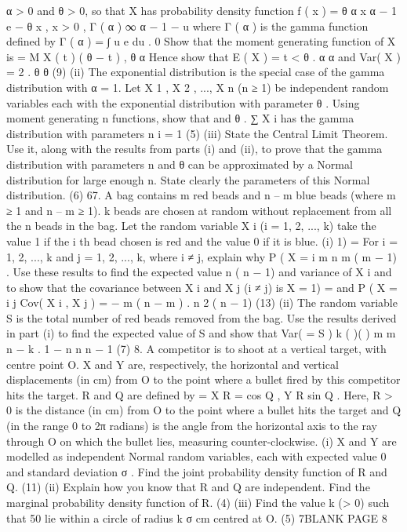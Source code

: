 α > 0 and θ > 0, so that X has probability density function
f ( x )
=
θ α x α − 1 e − θ x
, x > 0 ,
Γ ( α )
∞
α − 1 − u
where Γ ( α ) is the gamma function defined by Γ ( α ) =
∫ u e du .
0
Show that the moment generating function of X is
=
M X ( t )
( θ − t ) ,
θ
α
Hence show that E ( X ) =
t < θ .
α
α
and Var( X ) = 2 .
θ
θ
(9)
(ii)
The exponential distribution is the special case of the gamma distribution with
α = 1. Let X 1 , X 2 , ..., X n (n ≥ 1) be independent random variables each with
the exponential distribution with parameter θ . Using moment generating
n
functions, show that
and θ .
∑ X i
has the gamma distribution with parameters n
i = 1
(5)
(iii)
State the Central Limit Theorem. Use it, along with the results from parts (i)
and (ii), to prove that the gamma distribution with parameters n and θ can be
approximated by a Normal distribution for large enough n. State clearly the
parameters of this Normal distribution.
(6)
67.
A bag contains m red beads and n – m blue beads (where m ≥ 1 and n – m ≥ 1).
k beads are chosen at random without replacement from all the n beads in the bag.
Let the random variable X i (i = 1, 2, ..., k) take the value 1 if the i th bead chosen is red
and the value 0 if it is blue.
(i)
1) =
For i = 1, 2, ..., k and j = 1, 2, ..., k, where i ≠ j, explain why P ( X =
i
m
n
m ( m − 1)
. Use these results to find the expected value
n ( n − 1)
and variance of X i and to show that the covariance between X i and X j (i ≠ j) is
X =
1) =
and P ( X =
i
j
Cov( X i , X j ) = −
m ( n − m )
.
n 2 ( n − 1)
(13)
(ii)
The random variable S is the total number of red beads removed from the bag.
Use the results derived in part (i) to find the expected value of S and show that
Var(
=
S ) k
( )( )
m
m n − k
.
1 −
n
n n − 1
(7)
8.
A competitor is to shoot at a vertical target, with centre point O. X and Y are,
respectively, the horizontal and vertical displacements (in cm) from O to the point
where a bullet fired by this competitor hits the target. R and Q are defined by
=
X R =
cos Q , Y R sin Q .
Here, R > 0 is the distance (in cm) from O to the point where a bullet hits the target
and Q (in the range 0 to 2π radians) is the angle from the horizontal axis to the ray
through O on which the bullet lies, measuring counter-clockwise.
(i) X and Y are modelled as independent Normal random variables, each with
expected value 0 and standard deviation σ . Find the joint probability density
function of R and Q.
(11)
(ii) Explain how you know that R and Q are independent. Find the marginal
probability density function of R.
(4)
(iii) Find the value k (> 0) such that 50%
lie within a circle of radius k σ cm centred at O.
(5)
7BLANK PAGE
8
